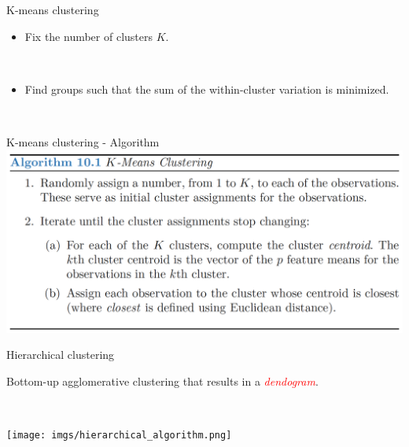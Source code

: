 \documentclass[
  10pt,
  ignorenonframetext,
]{beamer}
\providecommand{\tightlist}{%
  \setlength{\itemsep}{0pt}\setlength{\parskip}{0pt}}
\begin{document}
\begin{frame}
\begin{block}{K-means clustering}
\protect\hypertarget{k-means-clustering}{}
\(~\)

\begin{itemize}
\tightlist
\item
  Fix the number of clusters \(K\).
\end{itemize}

\(~\)

\begin{itemize}
\tightlist
\item
  Find groups such that the sum of the within-cluster variation is
  minimized.
\end{itemize}

\(~\)
\end{block}
\end{frame}

\begin{frame}{K-means clustering - Algorithm}
\protect\hypertarget{k-means-clustering---algorithm}{}
\includegraphics{imgs/kmeans_algo.png}
\end{frame}

\begin{frame}
\begin{block}{Hierarchical clustering}
\protect\hypertarget{hierarchical-clustering}{}
\(~\)

Bottom-up agglomerative clustering that results in a
\emph{\textcolor{red}{dendogram}}.

\(~\)

\texttt{[image: imgs/hierarchical\_algorithm.png]}
\end{block}
\end{frame}
\end{document}
